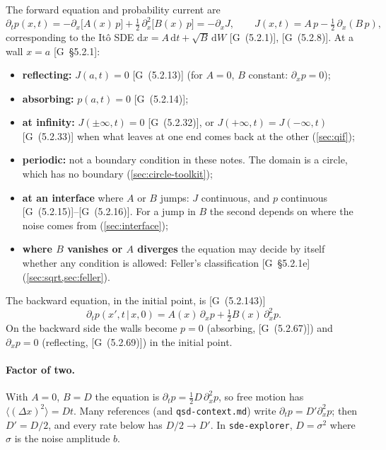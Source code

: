 \documentclass[11pt]{article}
\numberwithin{equation}{section}
\newcommand{\dd}{\mathrm{d}}
\newcommand{\avg}[1]{\langle #1\rangle}
\newcommand{\given}{\,|\,}
\newcommand{\G}[1]{[G~(#1)]}
\newcommand{\Gs}[1]{[G~\S#1]}
\begin{document}
The forward equation and probability current are
\begin{equation}
  \partial_t p(x,t) = -\partial_x\bigl[A(x)\,p\bigr] + \tfrac12\,\partial_x^2\bigl[B(x)\,p\bigr]
  = -\partial_x J,
  \qquad
  J(x,t) = A\,p - \tfrac12\,\partial_x(B\,p),
  \label{eq:fpe}
\end{equation}
corresponding to the It\^o SDE $\dd x = A\,\dd t + \sqrt{B}\,\dd W$ \G{5.2.1}, \G{5.2.8}. At a wall
$x=a$ \Gs{5.2.1}:
\begin{itemize}
  \item \textbf{reflecting:} $J(a,t)=0$ \G{5.2.13} (for $A=0$, $B$ constant: $\partial_x p=0$);
  \item \textbf{absorbing:} $p(a,t)=0$ \G{5.2.14};
  \item \textbf{at infinity:} $J(\pm\infty,t)=0$ \G{5.2.32}, or $J(+\infty,t)=J(-\infty,t)$ \G{5.2.33} when what
        leaves at one end comes back at the other (\cref{sec:qif});
  \item \textbf{periodic:} not a boundary condition in these notes. The domain is a circle, which has no
        boundary (\cref{sec:circle-toolkit});
  \item \textbf{at an interface} where $A$ or $B$ jumps: $J$ continuous, and $p$ continuous \G{5.2.15}--\G{5.2.16}.
        For a jump in $B$ the second depends on where the noise comes from (\cref{sec:interface});
  \item \textbf{where $B$ vanishes or $A$ diverges} the equation may decide by itself whether any condition is
        allowed: Feller's classification \Gs{5.2.1e} (\cref{sec:sqrt,sec:feller}).
\end{itemize}
The backward equation, in the initial point, is \G{5.2.143}
\begin{equation}
  \partial_t p(x',t\given x,0) = A(x)\,\partial_x p + \tfrac12 B(x)\,\partial_x^2 p .
  \label{eq:backward}
\end{equation}
On the backward side the walls become $p=0$ (absorbing, \G{5.2.67}) and $\partial_xp=0$ (reflecting,
\G{5.2.69}) in the initial point.

\paragraph{Factor of two.} With $A=0$, $B=D$ the equation is $\partial_t p=\tfrac12D\,\partial_x^2p$, so free
motion has $\avg{(\Delta x)^2}=Dt$. Many references (and \texttt{qsd-context.md}) write
$\partial_tp=D'\partial_x^2p$; then $D'=D/2$, and every rate below has $D/2\to D'$. In
\texttt{sde-explorer}, $D=\sigma^2$ where $\sigma$ is the noise amplitude $b$.
\end{document}
